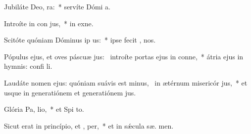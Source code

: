 \item Jubiláte Deo,  ra:~* servíte Dómi  a.
\item Introíte in con jus,~* in exne.
\item Scitóte quóniam Dóminus ip  us:~* ipse fecit ,    nos.
\item Pópulus ejus, et oves páscuæ jus:~\pscross{} introíte portas ejus in conne,~* átria ejus in hymnis: confi li.
\item Laudáte nomen ejus: quóniam suávis est minus,~\pscross{} in ætérnum misericór jus,~* et usque in generatiónem et generatiónem  jus.
\item Glória Pa,  lio,~* et Spi to.
\item Sicut erat in princípio, et ,  per,~* et in sǽcula sæ. men.
